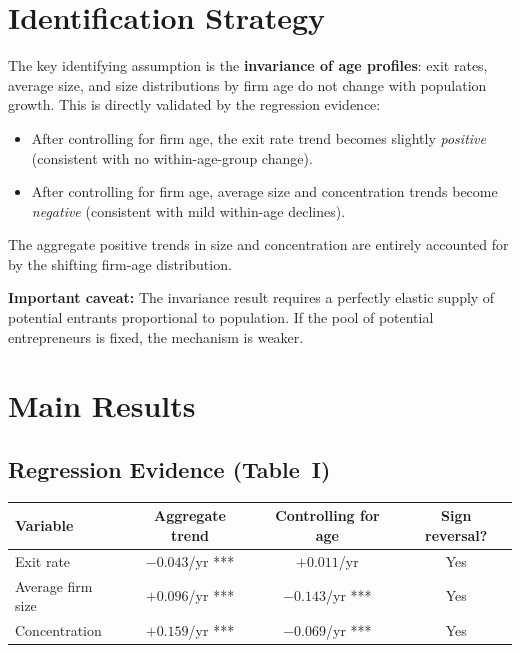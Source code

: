 \section{Identification Strategy}

The key identifying assumption is the \textbf{invariance of age profiles}:
exit rates, average size, and size distributions by firm age do not change
with population growth. This is directly validated by the regression evidence:
\begin{itemize}
  \item After controlling for firm age, the exit rate trend becomes slightly
    \emph{positive} (consistent with no within-age-group change).
  \item After controlling for firm age, average size and concentration
    trends become \emph{negative} (consistent with mild within-age
    declines).
\end{itemize}
The aggregate positive trends in size and concentration are entirely accounted
for by the shifting firm-age distribution.

\textbf{Important caveat:} The invariance result requires a perfectly elastic
supply of potential entrants proportional to population. If the pool of
potential entrepreneurs is fixed, the mechanism is weaker.

\section{Main Results}

\subsection*{Regression Evidence (Table~I)}

\begin{center}
\small
\begin{tabular}{lccc}
\toprule
\textbf{Variable} & \textbf{Aggregate trend} &
  \textbf{Controlling for age} & \textbf{Sign reversal?} \\
\midrule
Exit rate & $-0.043$/yr *** & $+0.011$/yr & Yes \\
Average firm size & $+0.096$/yr *** & $-0.143$/yr *** & Yes \\
Concentration & $+0.159$/yr *** & $-0.069$/yr *** & Yes \\
\bottomrule
\end{tabular}
\end{center}


